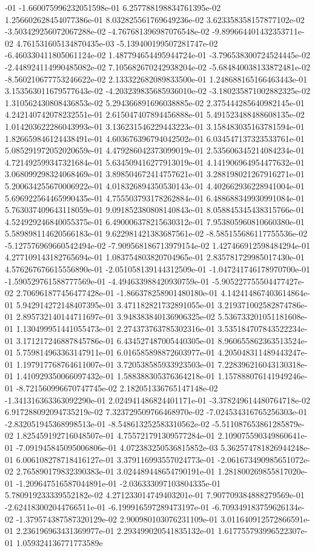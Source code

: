 -01	-1.660075996232051598e-01	6.257788198834761395e-02	1.256602628454077386e-01	8.032825561769649236e-02	3.623358358157877102e-02	-3.503429256072067288e-02	-4.767681396987076548e-02	-9.899664401432353711e-02	4.761531605134870435e-03	-5.139400199507281747e-02	-6.460330411805061124e-02	1.487794654495944724e-01	-3.796538300724524445e-02	-2.448924114990485082e-02	7.105682670242938204e-02	-5.684840038133872481e-02	-8.560210677753246622e-02	2.133322682089833500e-01	1.248688165166463443e-01	3.153563011679577643e-02	-4.203239835685936010e-02	-3.180235871002882325e-02	1.310562430808436853e-02	5.294366891696038885e-02	2.375444285640982145e-01	4.242140742078232551e-01	2.615047407894456888e-01	5.491523488488608135e-02	1.014203622286043993e-01	3.136231546229443223e-01	3.158483035163781594e-01	1.826659846124438491e-01	4.603676396794042502e-01	6.034547137323533761e-01	5.085291972052020659e-01	4.479286042373099019e-01	2.535606345214084234e-01	4.721492599347321684e-01	5.634509416277913019e-01	4.141906964954477632e-01	3.068099298324068469e-01	3.898504672414757621e-01	3.288198021267916271e-01	5.200634255670006922e-01	4.018326894350530143e-01	4.402662936228941004e-01	5.696922564465990435e-01	4.755503793178262884e-01	6.488688349930991084e-01	5.763037409643118059e-01	9.091852380808140843e-01	8.058845345438315766e-01	4.524929246840055375e-01	6.490006378215630312e-01	7.953805960810660380e-01	5.589898114620566183e-01	9.622981421383687561e-02	-8.585155686117755536e-02	-5.127576969660542494e-02	-7.909568186713979154e-02	1.427466912598484294e-01	4.277109143182765694e-01	1.083754803820704965e-01	2.835781729985017430e-01	4.576267676615556890e-01	-2.051058139144312509e-01	-1.047241746178970700e-01	-1.590529761588777569e-01	-4.494633988420930759e-01	-5.905227755504477427e-02	2.706961877456477428e-01	-1.866378258901480180e-01	4.142414867403614864e-01	5.942914272148407395e-01	3.471182821732891055e-01	3.219371002582874786e-01	2.895732140144711697e-01	3.948383840136906325e-02	5.536733201051181608e-01	1.130499951441055473e-01	2.274373763785302316e-01	3.535184707843522234e-01	3.171217246887845786e-01	6.434527487005440305e-01	8.960655862363513524e-01	5.759814963363147911e-01	6.016585898872603977e-01	4.205048311489443247e-01	1.197917768764611007e-01	3.720538585933923503e-01	7.228396216043130318e-01	1.410929350066097432e-01	1.588388305376364218e-01	1.157888076141949246e-01	-8.721560996670747745e-02	2.182051336765147148e-02	-1.341316363363092290e-01	2.024941486824401171e-01	-3.378249614480764718e-02	6.917288092094735219e-02	7.323729509766468970e-02	-7.024534316765256303e-01	-2.832051945368998513e-01	-8.548613252583310562e-02	-5.511087653861285879e-02	1.825459192716048507e-01	4.755721791309577284e-01	2.109075590349860641e-01	-7.091945845095006806e-01	4.072383250536815852e-03	5.362574781826944248e-01	6.006108278718416127e-01	3.379116993557024773e-01	-2.061673490985651072e-02	2.765890179832390383e-01	3.024489448654790191e-01	1.281800269855817020e-01	-1.209647516587044891e-01	-2.036333097103804335e-01	5.780919233339552182e-02	4.271233014749403201e-01	7.907709384888279569e-01	-2.624183002044766511e-01	-6.199916597289473197e-01	-6.709349183759626134e-02	-1.379574387587320129e-02	2.900980103076231109e-01	3.011640912572866591e-01	2.236196963431369977e-01	2.293499020541835132e-01	1.617755793996522307e-01	1.059324136771773589e